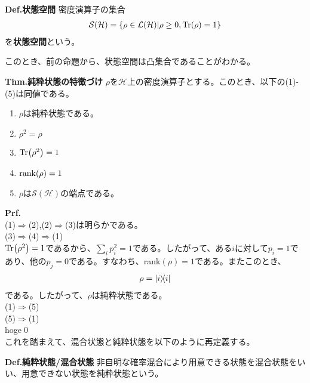 \documentclass[a4paper,11pt]{jsarticle}
\numberwithin{equation}{section}
\begin{document}
\begin{itembox}[l]{\textbf{Def.状態空間}}
    密度演算子の集合
    \begin{align}
        \mathcal{S}(\mathcal{H}) = \{ \rho \in \mathcal{L}(\mathcal{H}) | \rho \geq 0, \Tr(\rho) = 1 \}
    \end{align}
    を\textbf{状態空間}という。
\end{itembox}
このとき、前の命題から、状態空間は凸集合であることがわかる。\\

\begin{itembox}[l]{\textbf{Thm.純粋状態の特徴づけ}}
    $\rho$を$\mathcal{H}$上の密度演算子とする。このとき、以下の(1)-(5)は同値である。
    \begin{enumerate}
        \item $\rho$は純粋状態である。
        \item $\rho^2 = \rho$
        \item $\Tr(\rho^2) = 1$
        \item $\rank(\rho) = 1$
        \item $\rho$は$\mathcal{S}(\mathcal{H})$の端点である。
    \end{enumerate}
\end{itembox}
\textbf{Prf.}\\
(1)$\Rightarrow$(2),(2)$\Rightarrow$(3)は明らかである。\\
(3)$\Rightarrow$(4)$\Rightarrow$(1)\\
$\Tr(\rho^2) = 1$であるから、$\sum_i p_i^2 = 1$である。したがって、ある$i$に対して$p_i = 1$であり、他の$p_j = 0$である。すなわち、rank$(\rho) = 1$である。またこのとき、
\begin{align}
    \rho = \ketbra{i}{i}
\end{align}
である。したがって、$\rho$は純粋状態である。\\
(1)$\Rightarrow$(5)\\

(5)$\Rightarrow$(1)\\
hoge\qed\\

これを踏まえて、混合状態と純粋状態を以下のように再定義する。
\begin{itembox}[l]{\textbf{Def.純粋状態/混合状態}}
    非自明な確率混合により用意できる状態を混合状態をいい、用意できない状態を純粋状態という。
\end{itembox}
\end{document}
